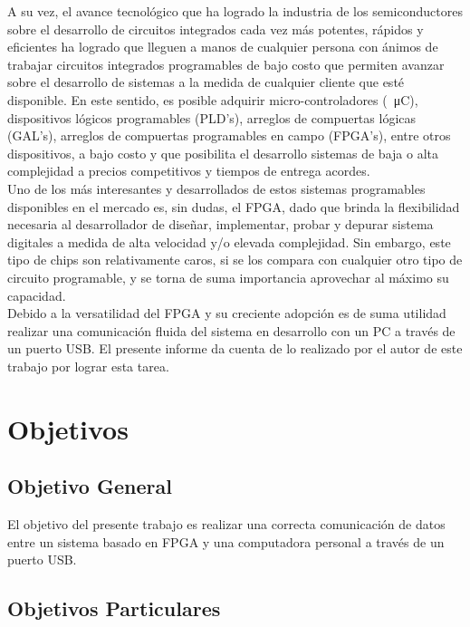 A su vez, el avance tecnológico que ha logrado la industria de los semiconductores sobre el desarrollo de circuitos
integrados cada vez más potentes, rápidos y eficientes ha logrado que lleguen a manos de cualquier persona con ánimos
de trabajar circuitos integrados programables de bajo costo que permiten avanzar sobre el desarrollo de sistemas a
la medida de cualquier cliente que esté disponible. En este sentido, es posible adquirir micro-controladores (\SI{}{\micro C}),
dispositivos lógicos programables (PLD's), arreglos de compuertas lógicas (GAL's), arreglos de compuertas programables
en campo (FPGA's), entre otros dispositivos, a bajo costo y que posibilita el desarrollo sistemas de baja o alta complejidad
a precios competitivos y tiempos de entrega acordes.\\

Uno de los más interesantes y desarrollados de estos sistemas programables disponibles en el mercado es, sin dudas, el FPGA,
dado que brinda la flexibilidad necesaria al desarrollador de diseñar, implementar, probar y depurar sistema digitales a
medida de alta velocidad y/o elevada complejidad. Sin embargo, este tipo de chips son relativamente caros, si se los compara
con cualquier otro tipo de circuito programable, y se torna de suma importancia aprovechar al máximo su capacidad.\\

Debido a la versatilidad del FPGA y su creciente adopción es de suma utilidad realizar una comunicación fluida del sistema en
desarrollo con un PC a través de un puerto USB. El presente informe da cuenta de lo realizado por el autor de este trabajo
por lograr esta tarea.\\

  \section{Objetivos}
    \subsection{Objetivo General}

    El objetivo del presente trabajo es realizar una correcta comunicación de datos entre un sistema basado en FPGA y una computadora
    personal a través de un puerto USB.

    \subsection{Objetivos Particulares}

